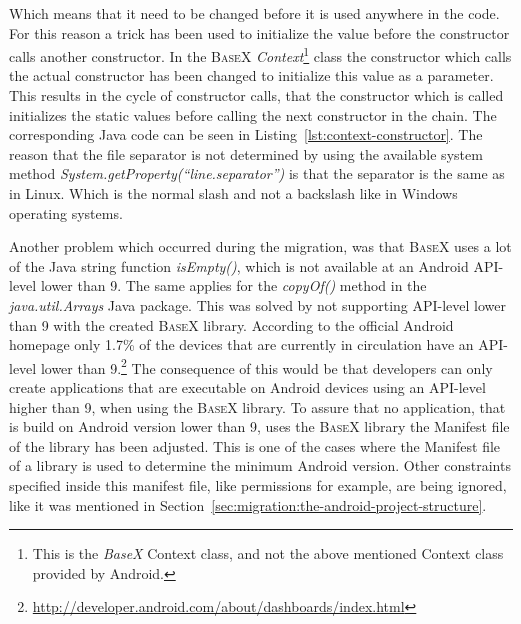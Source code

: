 Which means that it need to be changed before it is used anywhere in the code.
For this reason a trick has been used to initialize the value before the constructor calls another constructor.
In the \textsc{BaseX} \textit{Context}\footnote{This is the \textit{BaseX} Context class, and not the above mentioned Context class provided by Android.} class the constructor which calls the actual constructor has been changed to initialize this value as a parameter.
This results in the cycle of constructor calls, that the constructor which is called initializes the static values before calling the next constructor in the chain.
The corresponding Java code can be seen in Listing~\ref{lst:context-constructor}.
The reason that the file separator is not determined by using the available system method \textit{System.getProperty(``line.separator'')} is that the separator is the same as in Linux.
Which is the normal slash and not a backslash like in Windows operating systems.


Another problem which occurred during the migration, was that \textsc{BaseX} uses a lot of the Java string function \textit{isEmpty()}, which is not available at an Android API-level lower than 9.
The same applies for the \textit{copyOf()} method in the \textit{java.util.Arrays} Java package.
This was solved by not supporting API-level lower than 9 with the created \textsc{BaseX} library.
According to the official Android homepage only 1.7\% of the devices that are currently in circulation have an API-level lower than 9.\footnote{\url{http://developer.android.com/about/dashboards/index.html}}
The consequence of this would be that developers can only create applications that are executable on Android devices using an API-level higher than 9, when using the \textsc{BaseX} library.
To assure that no application, that is build on Android version lower than 9, uses the \textsc{BaseX} library the Manifest file of the library has been adjusted.
This is one of the cases where the Manifest file of a library is used to determine the minimum Android version.
Other constraints specified inside this manifest file, like permissions for example, are being ignored, like it was mentioned in Section~\ref{sec:migration:the-android-project-structure}.

